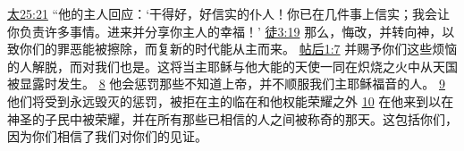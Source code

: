 \documentclass[12pt, a4paper, oneside]{ctexart}
\begin{document}
{		\href{https://biblehub.com/matthew/25-21.htm}{太25:21} “他的主人回应：‘干得好，好信实的仆人！你已在几件事上信实；我会让你负责许多事情。进来并分享你主人的幸福！’
		\href{https://biblehub.com/acts/3-19.htm}{徒3:19} 那么，悔改，并转向神，以致你们的罪恶能被擦除，而复新的时代能从主而来。
		\href{https://biblehub.com/2_thessalonians/1-7.htm}{帖后1:7} 并赐予你们这些烦恼的人解脱，而对我们也是。这将当主耶稣与他大能的天使一同在炽烧之火中从天国被显露时发生。
		\href{https://biblehub.com/2_thessalonians/1-8.htm}{8} 他会惩罚那些不知道上帝，并不顺服我们主耶稣福音的人。
		\href{https://biblehub.com/2_thessalonians/1-9.htm}{9} 他们将受到永远毁灭的惩罚，被拒在主的临在和他权能荣耀之外
		\href{https://biblehub.com/2_thessalonians/1-10.htm}{10} 在他来到以在神圣的子民中被荣耀，并在所有那些已相信的人之间被称奇的那天。这包括你们，因为你们相信了我们对你们的见证。
	}
\end{document}
